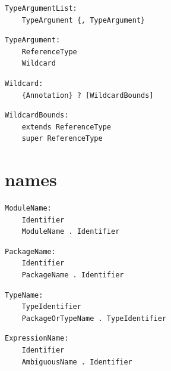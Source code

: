 \noindent\textbf{\texttt{}}\par
\begin{lstlisting}
TypeArgumentList:
    TypeArgument {, TypeArgument}
\end{lstlisting}

\noindent\textbf{\texttt{}}\par
\begin{lstlisting}
TypeArgument:
    ReferenceType
    Wildcard
\end{lstlisting}

\noindent\textbf{\texttt{}}\par
\begin{lstlisting}
Wildcard:
    {Annotation} ? [WildcardBounds]
\end{lstlisting}

\noindent\textbf{\texttt{}}\par
\begin{lstlisting}
WildcardBounds:
    extends ReferenceType
    super ReferenceType
\end{lstlisting}

\section{names}

\noindent\textbf{\texttt{}}\par
\begin{lstlisting}
ModuleName:
    Identifier
    ModuleName . Identifier
\end{lstlisting}

\noindent\textbf{\texttt{}}\par
\begin{lstlisting}
PackageName:
    Identifier
    PackageName . Identifier
\end{lstlisting}

\noindent\textbf{\texttt{}}\par
\begin{lstlisting}
TypeName:
    TypeIdentifier
    PackageOrTypeName . TypeIdentifier
\end{lstlisting}

\noindent\textbf{\texttt{}}\par
\begin{lstlisting}
ExpressionName:
    Identifier
    AmbiguousName . Identifier
\end{lstlisting}

